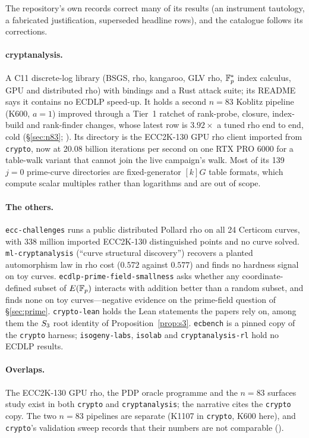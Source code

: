 The repository's own records correct many of its results (an instrument
tautology, a fabricated justification, superseded headline rows), and the
catalogue follows its corrections.

\paragraph{cryptanalysis.} A C11 discrete-log library (BSGS, rho, kangaroo,
GLV rho, $\mathbb{F}_p^*$ index calculus, GPU and distributed rho) with bindings
and a Rust attack suite; its README says it contains no ECDLP speed-up. It
holds a second $n=83$ Koblitz pipeline (K600, $a=1$) improved through a
Tier~1 ratchet of rank-probe, closure, index-build and rank-finder changes,
whose latest row is $3.92\times$ a tuned rho end to end, cold
(\S\ref{sec:n83}; ).
Its  directory is the ECC2K-130 GPU rho client imported
from \texttt{crypto}, now at 20.08 billion iterations per second on one RTX
PRO 6000 for a table-walk variant that cannot join the live campaign's walk.
Most of its 139 $j=0$ prime-curve directories are fixed-generator $[k]G$
table formats, which compute scalar multiples rather than logarithms and
are out of scope.

\paragraph{The others.} \texttt{ecc-challenges} runs a public
distributed Pollard rho on all 24 Certicom curves, with 338 million
imported ECC2K-130 distinguished points and no curve solved. \texttt{ml-cryptanalysis}
(``curve structural discovery'') recovers a planted automorphism law in
rho cost ($0.572$ against $0.577$) and finds no hardness signal on toy
curves. \texttt{ecdlp-prime-field-smallness} asks whether any
coordinate-defined subset of $E(\mathbb{F}_p)$ interacts with addition better than
a random subset, and finds none on toy curves---negative evidence on the
prime-field question of \S\ref{sec:prime}. \texttt{crypto-lean} holds the
Lean statements the papers rely on, among them the $S_{3}$ root identity of
Proposition~\ref{prop:s3}. \texttt{ecbench} is a pinned copy of the
\texttt{crypto} harness; \texttt{isogeny-labs}, \texttt{isolab} and
\texttt{cryptanalysis-rl} hold no ECDLP results.

\paragraph{Overlaps.} The ECC2K-130 GPU rho, the PDP oracle programme and
the $n=83$ surfaces study exist in both \texttt{crypto} and
\texttt{cryptanalysis}; the narrative cites the \texttt{crypto} copy. The
two $n=83$ pipelines are separate (K1107 in \texttt{crypto}, K600 here),
and \texttt{crypto}'s validation sweep records that their numbers are not
comparable ().
